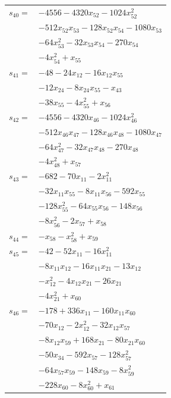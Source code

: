 \begin{longtable}{@{}r@{\;}l@{}}
\(s_{40}=\) & \(\displaystyle -4556 -4320x_{52} -1024x_{52}^{2}\) \\
 & \(\displaystyle -512x_{52}x_{53} -128x_{52}x_{54} -1080x_{53}\) \\
 & \(\displaystyle -64x_{53}^{2} -32x_{53}x_{54} -270x_{54}\) \\
 & \(\displaystyle -4x_{54}^{2} +x_{55}\) \\[3pt]
\(s_{41}=\) & \(\displaystyle -48 -24x_{12} -16x_{12}x_{55}\) \\
 & \(\displaystyle -12x_{24} -8x_{24}x_{55} -x_{43}\) \\
 & \(\displaystyle -38x_{55} -4x_{55}^{2} +x_{56}\) \\[3pt]
\(s_{42}=\) & \(\displaystyle -4556 -4320x_{46} -1024x_{46}^{2}\) \\
 & \(\displaystyle -512x_{46}x_{47} -128x_{46}x_{48} -1080x_{47}\) \\
 & \(\displaystyle -64x_{47}^{2} -32x_{47}x_{48} -270x_{48}\) \\
 & \(\displaystyle -4x_{48}^{2} +x_{57}\) \\[3pt]
\(s_{43}=\) & \(\displaystyle -682 -70x_{11} -2x_{11}^{2}\) \\
 & \(\displaystyle -32x_{11}x_{55} -8x_{11}x_{56} -592x_{55}\) \\
 & \(\displaystyle -128x_{55}^{2} -64x_{55}x_{56} -148x_{56}\) \\
 & \(\displaystyle -8x_{56}^{2} -2x_{57} +x_{58}\) \\[3pt]
\(s_{44}=\) & \(\displaystyle -x_{58} -x_{58}^{2} +x_{59}\) \\[3pt]
\(s_{45}=\) & \(\displaystyle -42 -52x_{11} -16x_{11}^{2}\) \\
 & \(\displaystyle -8x_{11}x_{12} -16x_{11}x_{21} -13x_{12}\) \\
 & \(\displaystyle -x_{12}^{2} -4x_{12}x_{21} -26x_{21}\) \\
 & \(\displaystyle -4x_{21}^{2} +x_{60}\) \\[3pt]
\(s_{46}=\) & \(\displaystyle -178 +336x_{11} -160x_{11}x_{60}\) \\
 & \(\displaystyle -70x_{12} -2x_{12}^{2} -32x_{12}x_{57}\) \\
 & \(\displaystyle -8x_{12}x_{59} +168x_{21} -80x_{21}x_{60}\) \\
 & \(\displaystyle -50x_{34} -592x_{57} -128x_{57}^{2}\) \\
 & \(\displaystyle -64x_{57}x_{59} -148x_{59} -8x_{59}^{2}\) \\
 & \(\displaystyle -228x_{60} -8x_{60}^{2} +x_{61}\) \\[3pt]

\end{longtable}
